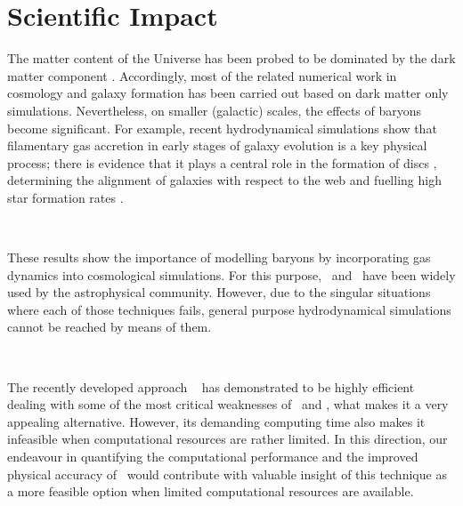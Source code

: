 \documentclass[a4,useAMS,usenatbib,usegraphicx,12pt]{article}
\begin{document}
\section{Scientific Impact}
The matter content of the Universe has been probed to be dominated by the dark 
matter component \citep{Planck13XVI}. Accordingly, most of the related numerical 
work in cosmology and galaxy formation has been carried out based on dark matter 
only simulations. Nevertheless, on smaller (galactic) scales, the effects of 
baryons become significant. For example, recent hydrodynamical simulations show 
that filamentary gas accretion in early stages of galaxy evolution is a key 
physical process; there is evidence that it plays a central role in the formation 
of discs \citep{Dubois14}, determining the alignment of galaxies with respect to 
the web \citep{Hahn10} and fuelling high star formation rates \citep{Dekel09}.

\

These results show the importance of modelling baryons by incorporating gas 
dynamics into cosmological simulations. For this purpose, \AMR\ and \SPH\ have
been widely used by the astrophysical community. However, due to the singular 
situations where each of those techniques fails, general purpose hydrodynamical
simulations cannot be reached by means of them.

\

The recently developed approach \AREPO\ \citet{Springel10} has demonstrated to 
be highly efficient dealing with some of the most critical weaknesses of \AMR\ 
and \SPH, what makes it a very appealing alternative. However, its demanding 
computing time also makes it infeasible when computational resources are rather 
limited. In this direction, our endeavour in quantifying the computational 
performance and the improved physical accuracy of \VPH\ would contribute with 
valuable insight of this technique as a more feasible option when limited 
computational resources are available.


\end{document}
